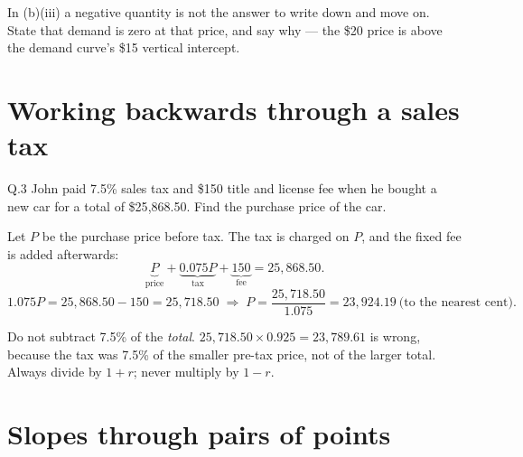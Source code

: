\begin{solution}
\end{solution}

\begin{pitfall}
In (b)(iii) a negative quantity is not the answer to write down and move on.
State that demand is zero at that price, and say why --- the \$20 price is above
the demand curve's \$15 vertical intercept.
\end{pitfall}

\section{Working backwards through a sales tax}

\begin{question}{Q.3}
John paid 7.5\% sales tax and \$150 title and license fee when he bought a new
car for a total of \$25{,}868.50. Find the purchase price of the car.
\end{question}

\begin{solution}
Let $P$ be the purchase price before tax. The tax is charged on $P$, and the
fixed fee is added afterwards:
\[
\underbrace{P}_{\text{price}}+\underbrace{0.075P}_{\text{tax}}
+\underbrace{150}_{\text{fee}}=25{,}868.50 .
\]
\[
1.075P=25{,}868.50-150=25{,}718.50
\;\Longrightarrow\;
P=\frac{25{,}718.50}{1.075}=23{,}924.19 \ \text{(to the nearest cent)}.
\]


\end{solution}

\begin{pitfall}
Do not subtract 7.5\% of the \emph{total}. $25{,}718.50\times 0.925=23{,}789.61$
is wrong, because the tax was 7.5\% of the smaller pre-tax price, not of the
larger total. Always divide by $1+r$; never multiply by $1-r$.
\end{pitfall}

\section{Slopes through pairs of points}

